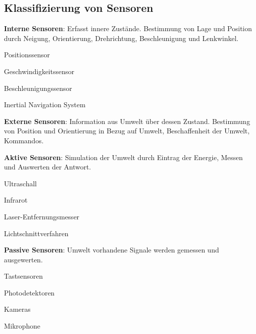 \subsection{Klassifizierung von Sensoren}
\begin{compactitem}
    \item \textbf{Interne Sensoren}: Erfasst innere Zustände. Bestimmung von Lage und Position durch
    Neigung, Orientierung, Drehrichtung, Beschleunigung und Lenkwinkel. \\
    \begin{inparaitem}
        \item Positionssensor
        \item Geschwindigkeitssensor
        \item Beschleunigungssensor
        \item Inertial Navigation System
    \end{inparaitem}
    \item \textbf{Externe Sensoren}: Information aus Umwelt über dessen Zustand. Bestimmung von Position
    und Orientierung in Bezug auf Umwelt, Beschaffenheit der Umwelt, Kommandos.
    \begin{compactitem}
        \item \textbf{Aktive Sensoren}: Simulation der Umwelt durch Eintrag der Energie, Messen und
        Auswerten der Antwort.\\
        \begin{inparaitem}
            \item Ultraschall
            \item Infrarot
            \item Laser-Entfernungsmesser
            \item Lichtschnittverfahren
        \end{inparaitem}
        \item \textbf{Passive Sensoren}: Umwelt vorhandene Signale werden gemessen und ausgewerten.\\
        \begin{inparaitem}
            \item Tastsensoren
            \item Photodetektoren
            \item Kameras
            \item Mikrophone
        \end{inparaitem}
    \end{compactitem}
\end{compactitem}
